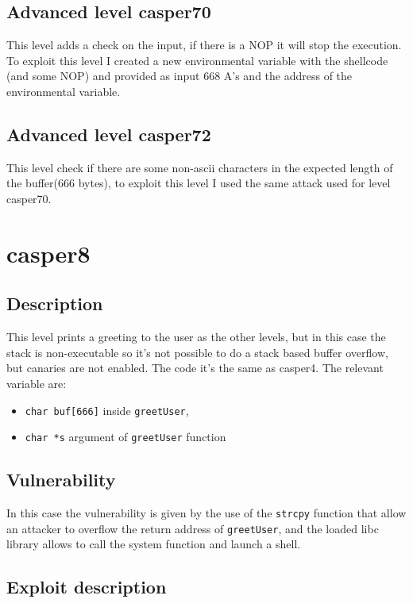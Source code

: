 \documentclass[a4paper,12pt]{article}
\begin{document}
\subsection{Advanced level casper70}

This level adds a check on the input, if there is a NOP it will stop the execution. To exploit this level I created a new environmental variable with the shellcode (and some NOP) and provided as input 668 A's and the address of the environmental variable.

\subsection{Advanced level casper72}
This level check if there are some non-ascii characters in the expected length of the buffer(666 bytes), to exploit this level I used the same attack used for level casper70.


\section{casper8}
\subsection{Description}

This level prints a greeting to the user as the other levels, but in this case the stack is non-executable so it's not possible to do a stack based buffer overflow, but canaries are not enabled. The code it's the same as casper4.
The relevant variable are:

\begin{itemize}
\item \texttt{char buf[666]} inside \texttt{greetUser},
\item \texttt{char *s} argument of \texttt{greetUser} function
\end{itemize}

\subsection{Vulnerability}

In this case the vulnerability is given by the use of the \texttt{strcpy} function that allow an attacker to overflow the return address of \texttt{greetUser}, and the loaded libc library allows to call the system function and launch a shell.

\subsection{Exploit description} 
\end{document}
